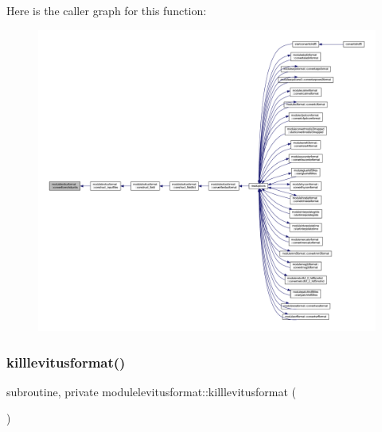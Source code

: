 Here is the caller graph for this function\+:\nopagebreak
\begin{figure}[H]
\begin{center}
\leavevmode
\includegraphics[width=350pt]{namespacemodulelevitusformat_a9df551d282255b0ecad476a5078996da_icgraph}
\end{center}
\end{figure}
\mbox{\label{namespacemodulelevitusformat_aee602b5ad04c2069cd2ddaea3d922bf9}} 
\subsubsection{\texorpdfstring{killlevitusformat()}{killlevitusformat()}}
{\footnotesize\ttfamily subroutine, private modulelevitusformat\+::killlevitusformat (\begin{DoxyParamCaption}{ }\end{DoxyParamCaption})\hspace{0.3cm}{\ttfamily [private]}}

